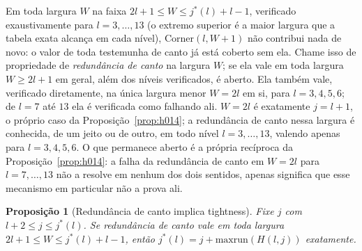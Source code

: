 \documentclass[11pt]{amsart}
\theoremstyle{plain}
\newtheorem{proposition}[theorem]{Proposi\c{c}\~ao}
\theoremstyle{definition}
\theoremstyle{remark}
\begin{document}
Em toda largura $W$ na faixa $2l+1\le W\le j^*(l)+l-1$, verificado exaustivamente para
$l=3,\dots,13$ (o extremo superior é a maior largura que a tabela exata alcança em cada nível),
$\mathrm{Corner}(l,W+1)$ não contribui nada de novo: o valor de toda testemunha de canto já está
coberto sem ela. Chame isso de propriedade de \emph{redundância de canto} na largura $W$; se ela
vale em toda largura $W\ge2l+1$ em geral, além dos níveis verificados, é aberto. Ela também vale,
verificado diretamente, na única largura menor $W=2l$ em si, para $l=3,4,5,6$; de $l=7$ até $13$
ela é verificada como falhando ali. $W=2l$ é exatamente $j=l+1$, o próprio caso da
Proposição~\ref{prop:h014}; a redundância de canto nessa largura é conhecida, de um jeito ou de
outro, em todo nível $l=3,\dots,13$, valendo apenas para $l=3,4,5,6$. O que permanece aberto é a
própria recíproca da Proposição~\ref{prop:h014}: a falha da redundância de canto em $W=2l$ para
$l=7,\dots,13$ não a resolve em nenhum dos dois sentidos, apenas significa que esse mecanismo em
particular não a prova ali.

\begin{proposition}[Redundância de canto implica tightness]
\label{prop:tight}
Fixe $j$ com $l+2\le j\le j^*(l)$. Se redundância de canto vale em toda largura
$2l+1\le W\le j^*(l)+l-1$, então $j^*(l)=j+\mathrm{maxrun}(H(l,j))$ exatamente.
\end{proposition}
\end{document}
